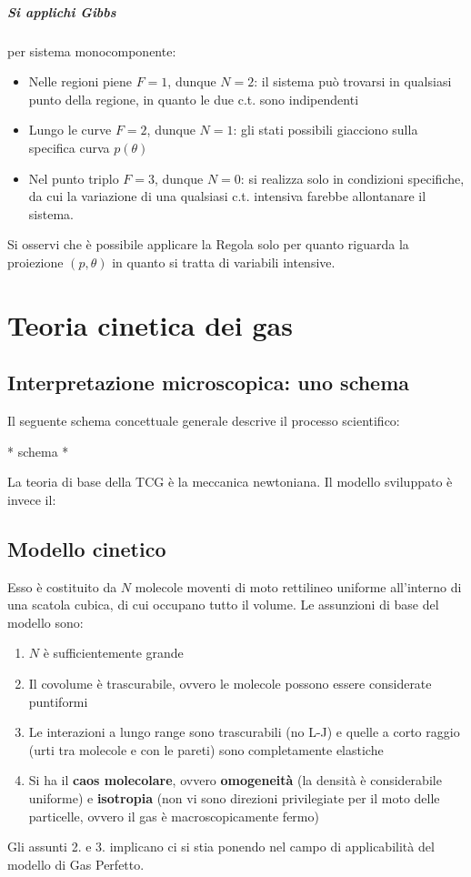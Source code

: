 \documentclass[10pt, oneside]{book}
\begin{document}
\paragraph{Si applichi Gibbs} per sistema monocomponente:
\begin{itemize}
\item Nelle regioni piene $F = 1$, dunque $N = 2$: il sistema può trovarsi in qualsiasi punto della regione, in quanto le due c.t. sono indipendenti
\item Lungo le curve $F =2$, dunque $N = 1$: gli stati possibili giacciono sulla specifica curva $p(\theta)$
\item Nel punto triplo $F = 3$, dunque $N = 0$: si realizza solo in condizioni specifiche, da cui la variazione di una qualsiasi c.t. intensiva farebbe allontanare il sistema.
\end{itemize}
Si osservi che è possibile applicare la Regola solo per quanto riguarda la proiezione $(p, \theta)$ in quanto si tratta di variabili intensive.

\chapter{Teoria cinetica dei gas}
\section{Interpretazione microscopica: uno schema}
Il seguente schema concettuale generale descrive il processo scientifico:

\begin{center}
* schema *
\end{center}

La teoria di base della TCG è la meccanica newtoniana. Il modello sviluppato è invece il:
\section{Modello cinetico}
Esso è costituito da $N$ molecole moventi di moto rettilineo uniforme all'interno di una scatola cubica, di cui occupano tutto il volume. Le assunzioni di base del modello sono:
\begin{enumerate}
\item $N$ è sufficientemente grande
\item Il covolume è trascurabile, ovvero le molecole possono essere considerate puntiformi
\item Le interazioni a lungo range sono trascurabili (no L-J) e quelle a corto raggio (urti tra molecole e con le pareti) sono completamente elastiche
\item Si ha il \textbf{caos molecolare}, ovvero  \textbf{omogeneità} (la densità è considerabile uniforme) e \textbf{isotropia} (non vi sono direzioni privilegiate per il moto delle particelle, ovvero il gas è macroscopicamente fermo)
\end{enumerate}
Gli assunti 2. e 3. implicano ci si stia ponendo nel campo di applicabilità del modello di Gas Perfetto.
\end{document}
